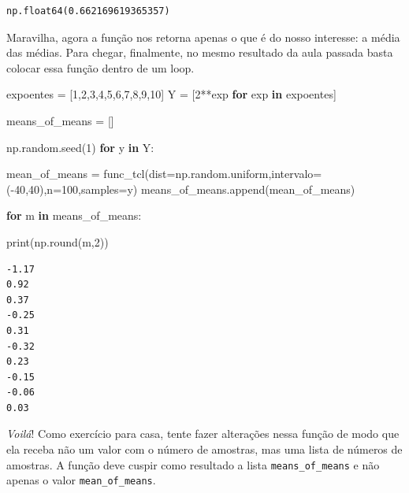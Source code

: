 \documentclass[
  brazilian,
  letterpaper,
  DIV=11,
  numbers=noendperiod]{scrreprt}
\newenvironment{Shaded}{\begin{snugshade}}{\end{snugshade}}
\newcommand{\BuiltInTok}[1]{\textcolor[rgb]{0.00,0.23,0.31}{#1}}
\newcommand{\ControlFlowTok}[1]{\textcolor[rgb]{0.00,0.23,0.31}{\textbf{#1}}}
\newcommand{\DecValTok}[1]{\textcolor[rgb]{0.68,0.00,0.00}{#1}}
\newcommand{\KeywordTok}[1]{\textcolor[rgb]{0.00,0.23,0.31}{\textbf{#1}}}
\newcommand{\NormalTok}[1]{\textcolor[rgb]{0.00,0.23,0.31}{#1}}
\newcommand{\OperatorTok}[1]{\textcolor[rgb]{0.37,0.37,0.37}{#1}}
\begin{document}
\begin{verbatim}
np.float64(0.662169619365357)
\end{verbatim}

Maravilha, agora a função nos retorna apenas o que é do nosso interesse:
a média das médias. Para chegar, finalmente, no mesmo resultado da aula
passada basta colocar essa função dentro de um loop.

\begin{Shaded}
\begin{Highlighting}[]
\NormalTok{expoentes }\OperatorTok{=}\NormalTok{ [}\DecValTok{1}\NormalTok{,}\DecValTok{2}\NormalTok{,}\DecValTok{3}\NormalTok{,}\DecValTok{4}\NormalTok{,}\DecValTok{5}\NormalTok{,}\DecValTok{6}\NormalTok{,}\DecValTok{7}\NormalTok{,}\DecValTok{8}\NormalTok{,}\DecValTok{9}\NormalTok{,}\DecValTok{10}\NormalTok{]}
\NormalTok{Y }\OperatorTok{=}\NormalTok{ [}\DecValTok{2}\OperatorTok{**}\NormalTok{exp }\ControlFlowTok{for}\NormalTok{ exp }\KeywordTok{in}\NormalTok{ expoentes]}

\NormalTok{means\_of\_means }\OperatorTok{=}\NormalTok{ []}

\NormalTok{np.random.seed(}\DecValTok{1}\NormalTok{)}
\ControlFlowTok{for}\NormalTok{ y }\KeywordTok{in}\NormalTok{ Y:}

\NormalTok{    mean\_of\_means }\OperatorTok{=}\NormalTok{ func\_tcl(dist}\OperatorTok{=}\NormalTok{np.random.uniform,intervalo}\OperatorTok{=}\NormalTok{(}\OperatorTok{{-}}\DecValTok{40}\NormalTok{,}\DecValTok{40}\NormalTok{),n}\OperatorTok{=}\DecValTok{100}\NormalTok{,samples}\OperatorTok{=}\NormalTok{y)}
\NormalTok{    means\_of\_means.append(mean\_of\_means)}
\end{Highlighting}
\end{Shaded}

\begin{Shaded}
\begin{Highlighting}[]
\ControlFlowTok{for}\NormalTok{ m }\KeywordTok{in}\NormalTok{ means\_of\_means:}
    
    \BuiltInTok{print}\NormalTok{(np.}\BuiltInTok{round}\NormalTok{(m,}\DecValTok{2}\NormalTok{))}
\end{Highlighting}
\end{Shaded}

\begin{verbatim}
-1.17
0.92
0.37
-0.25
0.31
-0.32
0.23
-0.15
-0.06
0.03
\end{verbatim}

\emph{Voilá}! Como exercício para casa, tente fazer alterações nessa
função de modo que ela receba não um valor com o número de amostras, mas
uma lista de números de amostras. A função deve cuspir como resultado a
lista \texttt{means\_of\_means} e não apenas o valor
\texttt{mean\_of\_means}.
\end{document}
